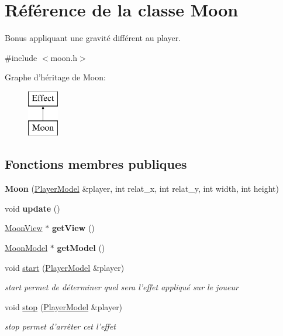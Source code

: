 \hypertarget{class_moon}{\section{Référence de la classe Moon}
\label{class_moon}
}


Bonus appliquant une gravité différent au player.  




{\ttfamily \#include $<$moon.\+h$>$}

Graphe d'héritage de Moon\+:\begin{figure}[H]
\begin{center}
\leavevmode
\includegraphics[height=2.000000cm]{class_moon}
\end{center}
\end{figure}
\subsection*{Fonctions membres publiques}
\begin{DoxyCompactItemize}
\item 
\hypertarget{class_moon_a59b7233ce62ae4856c53c8846ef85c70}{{\bfseries Moon} (\hyperlink{class_player_model}{Player\+Model} \&player, int relat\+\_\+x, int relat\+\_\+y, int width, int height)}\label{class_moon_a59b7233ce62ae4856c53c8846ef85c70}

\item 
\hypertarget{class_moon_a1ca4998aa2f6b9730aa073a45a70bbc2}{void {\bfseries update} ()}\label{class_moon_a1ca4998aa2f6b9730aa073a45a70bbc2}

\item 
\hypertarget{class_moon_ad2d57b1cce334cdc34d1d8e5956851d3}{\hyperlink{class_moon_view}{Moon\+View} $\ast$ {\bfseries get\+View} ()}\label{class_moon_ad2d57b1cce334cdc34d1d8e5956851d3}

\item 
\hypertarget{class_moon_a031db138882c53af2f97eeba06ab6272}{\hyperlink{class_moon_model}{Moon\+Model} $\ast$ {\bfseries get\+Model} ()}\label{class_moon_a031db138882c53af2f97eeba06ab6272}

\item 
void \hyperlink{class_moon_a6970aae5c81e3f98666e36da618b513f}{start} (\hyperlink{class_player_model}{Player\+Model} \&player)
\begin{DoxyCompactList}\small\item\em start permet de déterminer quel sera l'effet appliqué sur le joueur \end{DoxyCompactList}\item 
void \hyperlink{class_moon_a9eb4ffd52d8bb525d07b2a7407900786}{stop} (\hyperlink{class_player_model}{Player\+Model} \&player)
\begin{DoxyCompactList}\small\item\em stop permet d'arrêter cet l'effet \end{DoxyCompactList}\end{DoxyCompactItemize}


